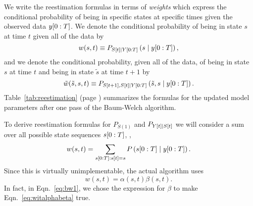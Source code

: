 We write the reestimation formulas in terms of \emph{weights} which
express the conditional probability of being in specific states at
specific times given the observed data $y[0:T]$.  We denote the
conditional probability of being in state $s$ at time $t$ given all of
the data by
\begin{equation}
  \label{eq:wit}
  w(s,t) \equiv P_{{S}{[t]}\mid Y[0:T]} \left(s\mid y[0:T]
  \right),
\end{equation}
and we denote the conditional probability, given all of the data, of
being in state $s$ at time $t$ and being in state ${\tilde s}$ at time
$t+1$ by
\begin{equation}
  \label{eq:wijt}
  {\tilde w}({\tilde s},s,t) \equiv P_{{S}{[t+1]},{S}{[t]}\mid Y[0:T]}
  \left({\tilde s},s\mid y[0:T] \right).
\end{equation}
Table~\ref{tab:reestimation} (page \pageref{tab:reestimation})
summarizes the formulas for the updated model parameters after one
pass of the Baum-Welch algorithm.

To derive reestimation formulas for $P_{S(1)}$ and
$P_{{Y}{[t]}\mid {S}{[t]}}$ we will consider a sum over all possible
state sequences $s[0:T]$, \ie,
\begin{equation}
  \label{eq:witFFE}
  w(s,t) = \sum_{s[0:T]:{s}{[t]}=s}
  P \left(s[0:T]\mid y[0:T]
  \right).
\end{equation}
Since this is virtually unimplementable, the actual algorithm uses
\begin{equation}
  \label{eq:witalphabeta}
  w(s,t) = \alpha(s,t) \beta(s,t).
\end{equation}
In fact, in Eqn.~\eqref{eq:bw1}, we chose the expression for $\beta$
to make Eqn.~\eqref{eq:witalphabeta} true.

